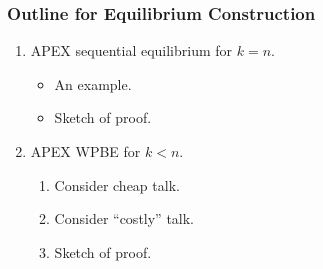 \documentclass[8pt]{beamer}
\begin{document}

\begin{frame}


  \frametitle{Outline for Equilibrium Construction}

\begin{enumerate}

\item APEX sequential equilibrium for $k=n$.
\begin{itemize}
\item An example.
\item Sketch of proof.
\end{itemize}
\item APEX WPBE for $k<n$.
\begin{enumerate}
\item Consider cheap talk.
\item Consider ``costly'' talk.
\item Sketch of proof.
\end{enumerate}
\end{enumerate}


\end{frame}
\end{document}
